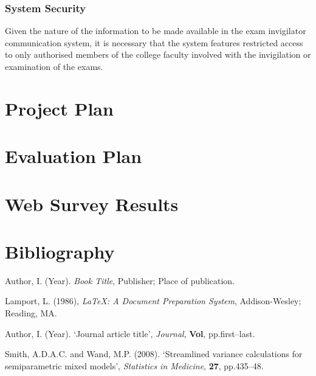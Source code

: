\documentclass[a4paper, 12pt, notitlepage]{report}
\begin{document}
\subsection{System Security}

Given the nature of the information to be made available in the exam invigilator communication system, it is necessary that the system features restricted access to only authorised members of the college faculty involved with the invigilation or examination of the exams.

\chapter{Project Plan}
%

\chapter{Evaluation Plan}
%

\appendix
\chapter{Web Survey Results}



\chapter*{Bibliography}
%
\begin{description}

\item Author, I. (Year). \emph{Book Title}, Publisher; Place of publication.

\item Lamport, L. (1986), \emph{\LaTeX: A Document Preparation System}, Addison-Wesley; Reading, MA.

\item Author, I. (Year). `Journal article title', \emph{Journal}, \textbf{Vol}, pp.first--last.

\item Smith, A.D.A.C. and Wand, M.P. (2008). `Streamlined variance calculations for semiparametric
mixed models', \emph{Statistics in Medicine}, \textbf{27}, pp.435--48.

\end{description}
\end{document}
